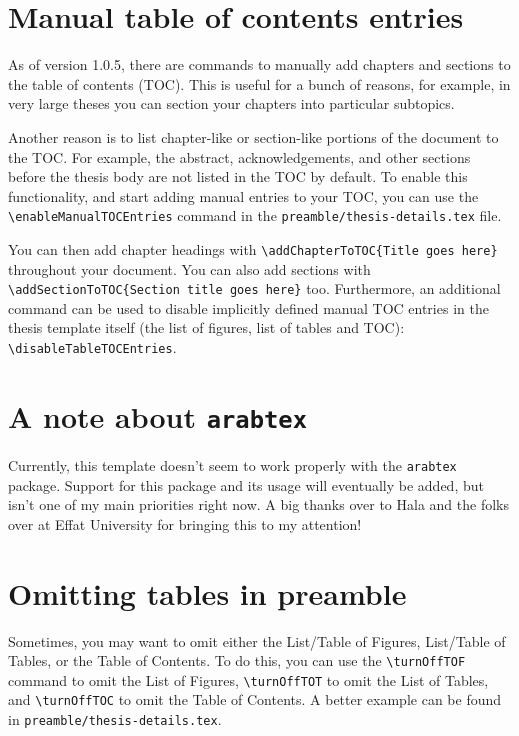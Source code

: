 \section{Manual table of contents entries}
As of version 1.0.5, there are commands to manually add chapters and sections to the table of contents (TOC). This is useful for a bunch of reasons, for example, in very large theses you can section your chapters into particular subtopics. 

Another reason is to list chapter-like or section-like portions of the document to the TOC. For example, the abstract, acknowledgements, and other sections before the thesis body are not listed in the TOC by default. To enable this functionality, and start adding manual entries to your TOC, you can use the \texttt{\textbackslash enableManualTOCEntries} command in the  \texttt{preamble/thesis-details.tex} file.

You can then add chapter headings with \texttt{\textbackslash addChapterToTOC\{Title goes here\}} throughout your document. You can also add sections with \texttt{\textbackslash addSectionToTOC\{Section title goes here\}} too. Furthermore, an additional command can be used to disable implicitly defined manual TOC entries in the thesis template itself (the list of figures, list of tables and TOC): \texttt{\textbackslash disableTableTOCEntries}.

\section{A note about \texttt{arabtex}}
Currently, this template doesn't seem to work properly with the \texttt{arabtex} package. Support for this package and its usage will eventually be added, but isn't one of my main priorities right now. A big thanks over to Hala and the folks over at Effat University for bringing this to my attention!

\section{Omitting tables in preamble}
Sometimes, you may want to omit either the List/Table of Figures, List/Table of Tables, or the Table of Contents. To do this, you can use the \texttt{\textbackslash turnOffTOF} command to omit the List of Figures, \texttt{\textbackslash turnOffTOT} to omit the List of Tables, and \texttt{\textbackslash turnOffTOC} to omit the Table of Contents. A better example can be found in \texttt{preamble/thesis-details.tex}.